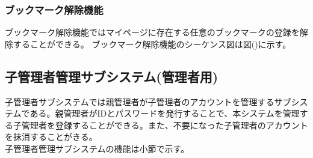 \documentclass[a4j]{jarticle}
\begin{document}
  \subsubsection{ブックマーク解除機能}
  ブックマーク解除機能ではマイページに存在する任意のブックマークの登録を解除することができる。
ブックマーク解除機能のシーケンス図は図()に示す。


  \subsection{子管理者管理サブシステム(管理者用)}
  子管理者サブシステムでは親管理者が子管理者のアカウントを管理するサブシステムである。親管理者がIDとパスワードを発行することで、本システムを管理する子管理者を登録することができる。また、不要になった子管理者のアカウントを抹消することがきる。\\
  子管理者管理サブシステムの機能は小節で示す。
\end{document}
